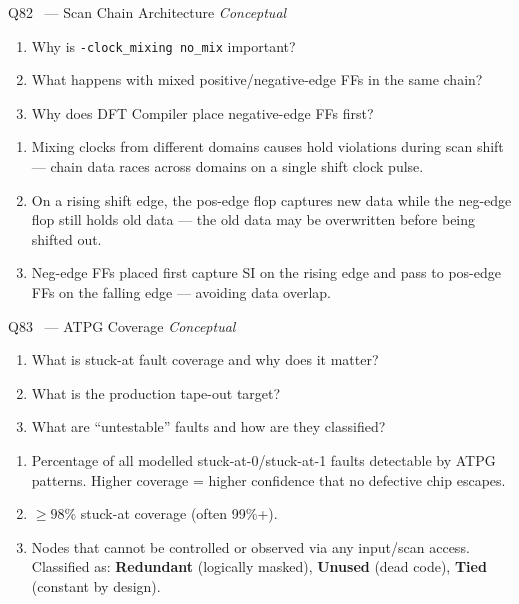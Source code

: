 \documentclass[12pt,a4paper]{article}
\newcommand{\advanced}{%
  \fbox{\textcolor{advred}{\bfseries\sffamily\small ADVANCED}}}
\newcommand{\moderate}{%
  \fbox{\textcolor{modoran}{\bfseries\sffamily\small MODERATE}}}
\begin{document}
\begin{questionbox}{Q82 \moderate\ --- Scan Chain Architecture \hfill\textit{Conceptual}}
\begin{enumerate}[label=\textbf{\alph*)}]
  \item Why is \texttt{-clock\_mixing no\_mix} important?
  \item What happens with mixed positive/negative-edge FFs in the same chain?
  \item Why does DFT Compiler place negative-edge FFs first?
\end{enumerate}
\end{questionbox}

\begin{answerbox}
\begin{enumerate}[label=\textbf{\alph*)}]
  \item Mixing clocks from different domains causes hold violations during scan shift --- chain data races across domains on a single shift clock pulse.
  \item On a rising shift edge, the pos-edge flop captures new data while the neg-edge flop still holds old data --- the old data may be overwritten before being shifted out.
  \item Neg-edge FFs placed first capture SI on the rising edge and pass to pos-edge FFs on the falling edge --- avoiding data overlap.
\end{enumerate}
\end{answerbox}

\begin{questionbox}{Q83 \advanced\ --- ATPG Coverage \hfill\textit{Conceptual}}
\begin{enumerate}[label=\textbf{\alph*)}]
  \item What is stuck-at fault coverage and why does it matter?
  \item What is the production tape-out target?
  \item What are ``untestable'' faults and how are they classified?
\end{enumerate}
\end{questionbox}

\begin{answerbox}
\begin{enumerate}[label=\textbf{\alph*)}]
  \item Percentage of all modelled stuck-at-0/stuck-at-1 faults detectable by ATPG patterns. Higher coverage = higher confidence that no defective chip escapes.
  \item $\geq 98\%$ stuck-at coverage (often 99\%+).
  \item Nodes that cannot be controlled or observed via any input/scan access. Classified as: \textbf{Redundant} (logically masked), \textbf{Unused} (dead code), \textbf{Tied} (constant by design).
\end{enumerate}
\end{answerbox}
\end{document}
